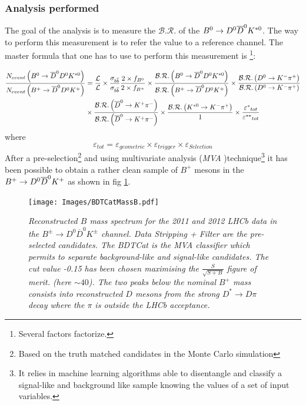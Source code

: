 \documentclass[paper=a4, fontsize=10pt]{scrartcl}
\numberwithin{equation}{section}		%
\numberwithin{figure}{section}			%
\numberwithin{table}{section}				%
\begin{document}
\subsubsection{Analysis performed}
The goal of the analysis is to measure the $\mathcal{B.R.}$ of the  $B^{0} \rightarrow D^0 \overline{D}^{0} K^{\ast 0}$. The way to perform this measurement is to refer the value to a reference channel. The master formula that one has to use to perform this measurement is \footnote{Several factors factorize.}:

\begin{equation}\label{1}
\begin{split} 
\frac { { N }_{ event }\left( B^0\rightarrow \overline{D}^0 D^0 K^{\ast 0} \right)  }{ { N }_{ event }\left( B^+\rightarrow \overline{D}^0 D^0 K^{+} \right)  }&  = \frac{\mathcal{L}}{\mathcal{L}}\times \frac{\sigma_{b\overline{b}}}{\sigma_{b\overline{b}}}   \frac { 2 \times { f }_{ { B }^{ 0 } } }{ 2 \times { f }_{ { B }^{ + } } } \times \frac { \mathcal{B.R.}\left( B^0\rightarrow \overline{D}^0 D^0 K^{\ast 0} \right)  }{ \mathcal{B.R.}\left(B^+\rightarrow \overline{D}^0 D^0 K^{+} \right)  } \times \frac { \mathcal{B.R.}\left( D^{0} \rightarrow K^{-} \pi^{+} \right)  }{ \mathcal{B.R.}\left( D^{0} \rightarrow K^{-} \pi^{+} \right)  }  \\   & \times \frac { \mathcal{B.R.}\left( \overline{D}^0 \rightarrow K^+ \pi^- \right)  }{ \mathcal{B.R.}\left( \overline{D}^0 \rightarrow K^+ \pi^- \right)  } \times \frac { \mathcal{B.R.}\left( K^{\ast 0} \rightarrow K^- \pi^+ \right)  }{ 1 } \times \frac { { \varepsilon ^{\ast} }_{ tot } }{ {  \varepsilon^{\ast \ast} }_{ tot } }
\end{split} 
\end{equation}
\normalsize where
\tiny \begin{equation} \label{epsilon}
 \varepsilon_{ tot } = \varepsilon_{geometric}\times \varepsilon_{trigger}\times \varepsilon_{Selection}
\end{equation}
\normalsize After a pre-selection\footnote{Based on the truth matched candidates in the Monte Carlo simulation} and using multivariate analysis (\textit{MVA} )technique\footnote{It relies in machine learning algorithms able to disentangle and classify a signal-like and background like sample knowing the values of a set of input variables.} it has been possible to obtain a rather clean sample of $B^{+}$ mesons in the $B^{+} \rightarrow D^0 \overline{D}^{0} K^{+}$ as shown in fig \ref{Bmass}.
\begin{figure}[h!]
\begin{center}
\texttt{[image: Images/BDTCatMassB.pdf]}
\caption{\textit{Reconstructed $B$ mass spectrum for  the 2011 and 2012 LHCb data in the $B^{\pm} \rightarrow D^{0} \overline{D}^{0} K^{\pm}$ channel. \textit{Data Stripping + Filter} are the pre-selected  candidates. The \textit{BDTCat} is the \textit{MVA} classifier which permits to separate background-like and signal-like candidates. The cut value \textit{-0.15} has been chosen maximising the $\frac{S}{\sqrt{S+B}}$ figure of merit. (here $\sim 40$). The two peaks below the nominal $B^{+}$ mass  consists into reconstructed $D$ mesons from the strong $D^{\ast}\rightarrow D \pi$ decay where the $\pi$ is outside the LHCb acceptance.}}\label{Bmass}
\end{center}
\end{figure}
\end{document}
